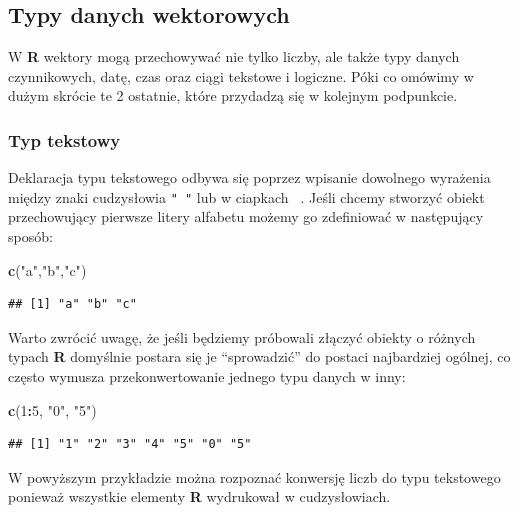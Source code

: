 \documentclass[]{book}
\newenvironment{Shaded}{\begin{snugshade}}{\end{snugshade}}
\newcommand{\KeywordTok}[1]{\textcolor[rgb]{0.13,0.29,0.53}{\textbf{#1}}}
\newcommand{\DecValTok}[1]{\textcolor[rgb]{0.00,0.00,0.81}{#1}}
\newcommand{\StringTok}[1]{\textcolor[rgb]{0.31,0.60,0.02}{#1}}
\newcommand{\OperatorTok}[1]{\textcolor[rgb]{0.81,0.36,0.00}{\textbf{#1}}}
\newcommand{\NormalTok}[1]{#1}
\theoremstyle{definition}
\theoremstyle{definition}
\theoremstyle{definition}
\theoremstyle{remark}
\begin{document}
\subsection{Typy danych wektorowych}\label{typy-danych-wektorowych}

W \textbf{R} wektory mogą przechowywać nie tylko liczby, ale także typy
danych czynnikowych, datę, czas oraz ciągi tekstowe i logiczne. Póki co
omówimy w dużym skrócie te 2 ostatnie, które przydadzą się w kolejnym
podpunkcie.

\subsubsection{Typ tekstowy}\label{typ-tekstowy}

Deklaracja typu tekstowego odbywa się poprzez wpisanie dowolnego
wyrażenia między znaki cudzysłowia \texttt{"\ "} lub w ciapkach
\texttt{\textquotesingle{}\ \textquotesingle{}}. Jeśli chcemy stworzyć
obiekt przechowujący pierwsze litery alfabetu możemy go zdefiniować w
następujący sposób:

\begin{Shaded}
\begin{Highlighting}[]
\KeywordTok{c}\NormalTok{(}\StringTok{"a"}\NormalTok{,}\StringTok{"b"}\NormalTok{,}\StringTok{"c"}\NormalTok{)}
\end{Highlighting}
\end{Shaded}

\begin{verbatim}
## [1] "a" "b" "c"
\end{verbatim}

Warto zwrócić uwagę, że jeśli będziemy próbowali złączyć obiekty o
różnych typach \textbf{R} domyślnie postara się je ``sprowadzić'' do
postaci najbardziej ogólnej, co często wymusza przekonwertowanie jednego
typu danych w inny:

\begin{Shaded}
\begin{Highlighting}[]
\KeywordTok{c}\NormalTok{(}\DecValTok{1}\OperatorTok{:}\DecValTok{5}\NormalTok{, }\StringTok{"0"}\NormalTok{, }\StringTok{"5"}\NormalTok{)}
\end{Highlighting}
\end{Shaded}

\begin{verbatim}
## [1] "1" "2" "3" "4" "5" "0" "5"
\end{verbatim}

W powyższym przykładzie można rozpoznać konwersję liczb do typu
tekstowego ponieważ wszystkie elementy \textbf{R} wydrukował w
cudzysłowiach.
\end{document}
